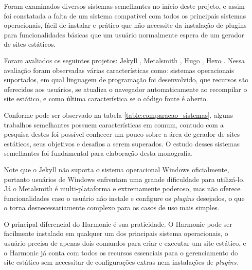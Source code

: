 \documentclass[ppginf, pep]{esinucpel}
\begin{document}
Foram examinados diversos sistemas semelhantes no início deste projeto, e assim foi constatada a falta de um sistema compatível com todos os principais sistemas operacionais, fácil de instalar e prático que não necessite da instalação de plugins para funcionalidades básicas que um usuário normalmente espera de um gerador de sites estáticos.

Foram avaliados os seguintes projetos: Jekyll \cite{jekyll}, Metalsmith \cite{metalsmith}, Hugo \cite{hugo}, Hexo \cite{hexo}. Nessa avaliação foram observadas várias características como: sistemas operacionais suportados, em qual linguagem de programação foi desenvolvido, que recursos são oferecidos aos usuários, se atualiza o navegador automaticamente ao recompilar o site estático, e como última característica se o código fonte é aberto.

Conforme pode ser observado na tabela \ref{table:comparacao_sistemas}, alguns trabalhos semelhantes possuem características em comum, contudo com a pesquisa destes foi possível conhecer um pouco sobre a área de gerador de sites estáticos, seus objetivos e desafios a serem superados. O estudo desses sistemas semelhantes foi fundamental para elaboração desta monografia.

Note que o Jekyll não suporta o sistema operacional Windows oficialmente, portanto usuários de Windows enfrentam uma grande dificuldade para utilizá-lo. Já o Metalsmith é multi-plataforma e extremamente poderoso, mas não oferece funcionalidades caso o usuário não instale e configure os \textit{plugins} desejados, o que o torna desnecessariamente complexo para os casos de uso mais simples.

O principal diferencial do Harmonic é sua praticidade. O Harmonic pode ser facilmente instalado em qualquer um dos principais sistema operacionais, o usuário precisa de apenas dois comandos para criar e executar um site estático, e o Harmonic já conta com todos os recursos essenciais para o gerenciamento do site estático sem necessitar de configurações extras nem instalações de \textit{plugins}.
\end{document}
